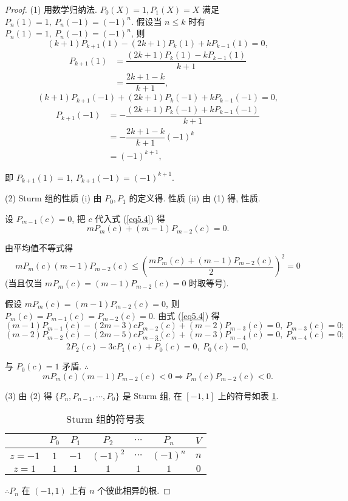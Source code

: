 \documentclass[UTF8]{ctexart}
\begin{document}
\begin{proof}
    (1) 用数学归纳法. $P_0(X)=1,P_1(X)=X$ 满足 $P_n(1)=1,\ P_n(-1)=(-1)^n$. 假设当 $n\leq k$ 时有 $P_n(1)=1,\ P_n(-1)=(-1)^n$, 则
    \[(k+1)P_{k+1}(1)-(2k+1)P_k(1)+kP_{k-1}(1)=0,\]
    \begin{align*}
        P_{k+1}(1) & =\dfrac{(2k+1)P_k(1)-kP_{k-1}(1)}{k+1} \\
        & =\dfrac{2k+1-k}{k+1},
    \end{align*}
    \[(k+1)P_{k+1}(-1)+(2k+1)P_k(-1)+kP_{k-1}(-1)=0,\]
    \begin{align*}
        P_{k+1}(-1) & =-\dfrac{(2k+1)P_k(-1)+kP_{k-1}(-1)}{k+1} \\
        & =-\dfrac{2k+1-k}{k+1}(-1)^k \\
        & =(-1)^{k+1},
    \end{align*}

    即 $P_{k+1}(1)=1,\ P_{k+1}(-1)=(-1)^{k+1}$.

    (2) Sturm 组的性质 (i) 由 $P_0,P_1$ 的定义得. 性质 (ii) 由 (1) 得, 性质.

    设 $P_{m-1}(c)=0$, 把 $c$ 代入式 (\ref{eq5.4}) 得
    \[mP_m(c)+(m-1)P_{m-2}(c)=0.\]

    由平均值不等式得
    \[mP_m(c)(m-1)P_{m-2}(c)\leq\left(\dfrac{mP_m(c)+(m-1)P_{m-2}(c)}{2}\right)^2=0\]
    (当且仅当 $mP_m(c)=(m-1)P_{m-2}(c)=0$ 时取等号).

    假设 $mP_m(c)=(m-1)P_{m-2}(c)=0$, 则 $P_m(c)=P_{m-1}(c)=P_{m-2}(c)=0$. 由式 (\ref{eq5.4}) 得
    \[(m-1)P_{m-1}(c)-(2m-3)cP_{m-2}(c)+(m-2)P_{m-3}(c)=0,\ P_{m-3}(c)=0;\]
    \[(m-2)P_{m-2}(c)-(2m-5)cP_{m-3}(c)+(m-3)P_{m-4}(c)=0,\ P_{m-4}(c)=0;\]
    \[\cdots\]
    \[2P_2(c)-3cP_1(c)+P_0(c)=0,\ P_0(c)=0,\]

    与 $P_0(c)=1$ 矛盾. $\therefore$
    \[mP_m(c)(m-1)P_{m-2}(c)<0\Rightarrow P_m(c)P_{m-2}(c)<0.\]

    (3) 由 (2) 得 $\{P_n,P_{n-1},\cdots,P_0\}$ 是 Sturm 组, 在 $[-1,1]$ 上的符号如表 \ref{tb4}.

    \begin{table}\caption{Sturm 组的符号表}\label{tb4}
        \begin{center}
            \begin{tabular}{c|ccccc|c}
                & $P_0$ & $P_1$ & $P_2$ & $\cdots$ & $P_n$ & $V$ \\
                \hline
                $z=-1$ & $1$ & $-1$ & $(-1)^2$ & $\cdots$ & $(-1)^n$ & $n$ \\
                $z=1$  & $1$ & $1$ & $1$ & $1$ & $1$ & $0$ \\
            \end{tabular}
        \end{center}
    \end{table}

    $\therefore P_n$ 在 $(-1,1)$ 上有 $n$ 个彼此相异的根.
\end{proof}
\end{document}
